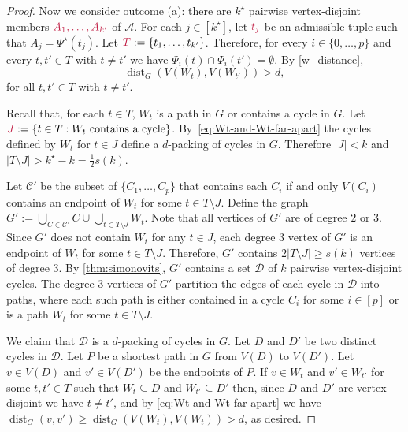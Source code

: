 \documentclass{patmorin}
\newcommand{\pat}[1]{\textcolor{Blue}{[Pat: #1]}}
\newcommand{\gwen}[1]{\textcolor{Purple}{Gwen: #1}}
\DeclareMathOperator{\dist}{dist}
\DeclarePairedDelimiter\set{\{}{\}}
\begin{document}
\begin{proof}
Now we consider outcome (a): 
there are $k^\star$ pairwise vertex-disjoint members $\mathdefin{A_1,\ldots,A_{k'}}$ of $\mathcal{A}$. 
For each $j\in[k^\star]$, let $\mathdefin{t_j}$ be an admissible tuple such that $A_j = \Psi^\star(t_j)$. 
Let $\mathdefin{T}:=\set{t_1,\ldots, t_{k'}}$. 
Therefore, for every $i\in\{0,\ldots,p\}$ 
and every $t,t'\in T$ with $t\neq t'$ we have $\Psi_i(t) \cap \Psi_i(t') = \emptyset$. 
By \cref{w_distance}, 
\begin{equation}\label{eq:Wt-and-Wt-far-apart}
\dist_G(V(W_{t}), V(W_{t'}))> d, 
\end{equation}
for all $t,t'\in T$ with $t\neq t'$. 

Recall that, for each $t\in T$, $W_t$ is a path in $G$ or contains a cycle in $G$. 
Let $\mathdefin{J}:=\{t\in T:\text{$W_t$ contains a cycle}\}$.  By~\eqref{eq:Wt-and-Wt-far-apart} the cycles defined by $W_t$ for $t\in J$ define a $d$-packing of cycles in $G$.  Therefore $|J|<k$ and $|T\setminus J|> k^\star-k= \tfrac{1}{2}s(k)$.

Let $\mathcal{C}'$ be the subset of $\{C_1,\ldots,C_p\}$ that contains each $C_i$ if and only $V(C_i)$ contains an endpoint of $W_t$ for some $t\in T\setminus J$.  Define the graph $G':=\bigcup_{C\in\mathcal{C}'} C\cup \bigcup_{t\in T\setminus J} W_{t}$.  
Note that all vertices of $G'$ are of degree $2$ or $3$.  Since $G'$ does not contain $W_t$ for any $t\in J$, each degree $3$ vertex of $G'$ is an endpoint of $W_{t}$ for some $t\in T\setminus J$. 
Therefore, $G'$ contains $2|T\setminus J|\geq s(k)$ vertices of degree $3$.
By \cref{thm:simonovits}, $G'$ contains a set $\mathcal{D}$ of $k$ pairwise vertex-disjoint cycles.  The degree-$3$ vertices of $G'$ partition the edges of each cycle in $\mathcal{D}$ into paths, where each such path is either contained in a cycle $C_i$ for some $i\in[p]$ or is a path $W_t$ for some $t\in T\setminus J$.  

We claim that $\mathcal{D}$ is a $d$-packing of cycles in $G$. 
Let $D$ and $D'$ be two distinct cycles in $\mathcal{D}$.  Let $P$ be a shortest path in $G$ from $V(D)$ to $V(D')$.  Let $v\in V(D)$ and $v'\in V(D')$ be the endpoints of $P$.  If $v\in W_t$ and $v'\in W_{t'}$ for some $t,t'\in T$ such that $W_t\subseteq D$ and $W_{t'}\subseteq D'$ then, 
since $D$ and $D'$ are vertex-disjoint we have $t\neq t'$, and by \eqref{eq:Wt-and-Wt-far-apart} we have $\dist_G(v,v')\ge \dist_G(V(W_t),V(W_t))>d$, as desired.  


\end{proof}
\end{document}
